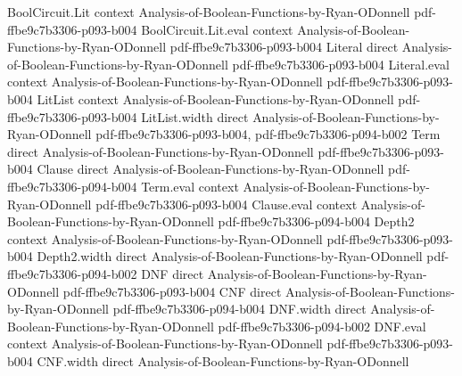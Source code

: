 \begin{lemma}
\label{BoolFourier.expectation_char_nonempty}
\leanok
{}
\proofstep
  {BoolCircuit.Lit}
  {context}
  {Analysis-of-Boolean-Functions-by-Ryan-ODonnell}
  {pdf-ffbe9c7b3306-p093-b004}
\proofstep
  {BoolCircuit.Lit.eval}
  {context}
  {Analysis-of-Boolean-Functions-by-Ryan-ODonnell}
  {pdf-ffbe9c7b3306-p093-b004}
\proofstep
  {Literal}
  {direct}
  {Analysis-of-Boolean-Functions-by-Ryan-ODonnell}
  {pdf-ffbe9c7b3306-p093-b004}
\proofstep
  {Literal.eval}
  {context}
  {Analysis-of-Boolean-Functions-by-Ryan-ODonnell}
  {pdf-ffbe9c7b3306-p093-b004}
\proofstep
  {LitList}
  {context}
  {Analysis-of-Boolean-Functions-by-Ryan-ODonnell}
  {pdf-ffbe9c7b3306-p093-b004}
\proofstep
  {LitList.width}
  {direct}
  {Analysis-of-Boolean-Functions-by-Ryan-ODonnell}
  {pdf-ffbe9c7b3306-p093-b004,
    pdf-ffbe9c7b3306-p094-b002}
\proofstep
  {Term}
  {direct}
  {Analysis-of-Boolean-Functions-by-Ryan-ODonnell}
  {pdf-ffbe9c7b3306-p093-b004}
\proofstep
  {Clause}
  {direct}
  {Analysis-of-Boolean-Functions-by-Ryan-ODonnell}
  {pdf-ffbe9c7b3306-p094-b004}
\proofstep
  {Term.eval}
  {context}
  {Analysis-of-Boolean-Functions-by-Ryan-ODonnell}
  {pdf-ffbe9c7b3306-p093-b004}
\proofstep
  {Clause.eval}
  {context}
  {Analysis-of-Boolean-Functions-by-Ryan-ODonnell}
  {pdf-ffbe9c7b3306-p094-b004}
\proofstep
  {Depth2}
  {context}
  {Analysis-of-Boolean-Functions-by-Ryan-ODonnell}
  {pdf-ffbe9c7b3306-p093-b004}
\proofstep
  {Depth2.width}
  {direct}
  {Analysis-of-Boolean-Functions-by-Ryan-ODonnell}
  {pdf-ffbe9c7b3306-p094-b002}
\proofstep
  {DNF}
  {direct}
  {Analysis-of-Boolean-Functions-by-Ryan-ODonnell}
  {pdf-ffbe9c7b3306-p093-b004}
\proofstep
  {CNF}
  {direct}
  {Analysis-of-Boolean-Functions-by-Ryan-ODonnell}
  {pdf-ffbe9c7b3306-p094-b004}
\proofstep
  {DNF.width}
  {direct}
  {Analysis-of-Boolean-Functions-by-Ryan-ODonnell}
  {pdf-ffbe9c7b3306-p094-b002}
\proofstep
  {DNF.eval}
  {context}
  {Analysis-of-Boolean-Functions-by-Ryan-ODonnell}
  {pdf-ffbe9c7b3306-p093-b004}
\proofstep
  {CNF.width}
  {direct}
  {Analysis-of-Boolean-Functions-by-Ryan-ODonnell}

\end{lemma}
